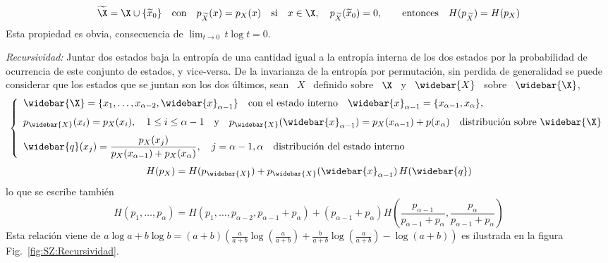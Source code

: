 \begin{propiedades}
  \[
  \widetilde{\X}  =  \X  \cup  \{  \widetilde{x}_0  \}  \quad  \mbox{con}  \quad
  p_{\widetilde{X}}(x)  =   p_X(x)  \quad  \mbox{si}  \quad  x   \in  \X,  \quad
  p_{\widetilde{X}}(\widetilde{x}_0)   =   0,   \qquad   \mbox{entonces}   \quad
  H(p_{\widetilde{X}}) = H(p_X)
  \]
  Esta propiedad  es obvia, consecuencia de  $\displaystyle \lim_{t \to  0} \, t
  \log t = 0$.
%
\setcounter{PropRecursividad}{\value{enumi}}
\item\label{prop:SZ:recursividad} {\it Recursividad:} Juntar dos estados baja la
  entrop\'ia de  una cantidad igual a  la entrop\'ia interna de  los dos estados
  por  la   probabilidad  de   ocurrencia  de  este   conjunto  de   estados,  y
  vice-versa. De la  invarianza de la entrop\'ia por  permutaci\'on, sin perdida
  de generalidad se  puede considerar que los estados que se  juntan son los dos
  \'ultimos, \ie sean \ $X$ \ definido  sobre \ $\X$ \ y \ $\widebar{X}$ \ sobre
  \ $\widebar{\X}$,
  \[
  \left\{  \begin{array}{l}\widebar{\X}  = \{  x_1  ,  \ldots  , x_{\alpha-2}  ,
      \widebar{x}_{\alpha-1}\} \quad \mbox{con el estado interno} \quad
      \widebar{x}_{\alpha-1}   =  \{   x_{\alpha-1}  ,   x_\alpha  \},\\[2.5mm]
      p_{\widebar{X}}(x_i) = p_X(x_i), \quad 1 \le i \le \alpha-1 \quad \mbox{y}
      \quad p_{\widebar{X}}(\widebar{x}_{\alpha-1}) = p_X(x_{\alpha-1}) +
      p(x_\alpha)  \quad  \mbox{distribuci\'on  sobre  }  \widebar{\X}\\[2.5mm]
      \displaystyle   \widebar{q}(x_j)  =   \frac{p_X(x_j)}{p_X(x_{\alpha-1})  +
        p_X(x_\alpha)},  \quad j =  \alpha-1, \alpha  \quad \mbox{distribuci\'on
        del estado interno}\end{array}\right.
  \]
  \[
  H(p_X)  =   H(p_{\widebar{X}})  +  p_{\widebar{X}}(\widebar{x}_{\alpha-1})  \,
  H(\widebar{q})
  \]
  lo que se escribe tambi\'en
  \[
  H(p_1,\ldots,p_\alpha)  =  H(p_1,\ldots,p_{\alpha-2},p_{\alpha-1}+p_\alpha)  +
  \left(             p_{\alpha-1}+p_\alpha            \right)            H\left(
    \frac{p_{\alpha-1}}{p_{\alpha-1}+p_\alpha}                                  ,
    \frac{p_\alpha}{p_{\alpha-1}+p_\alpha}\right)
  \]
  Esta relaci\'on  viene de $a \log  a + b  \log b = (a+b)  \left( \frac{a}{a+b}
    \log\left(  \frac{a}{a+b} \right)  + \frac{b}{a+b}  \log\left( \frac{a}{a+b}
    \right)   -   \log(  a   +   b  )\right)$   es   ilustrada   en  la   figura
  Fig.~\ref{fig:SZ:Recursividad}.\newline

\end{propiedades}
